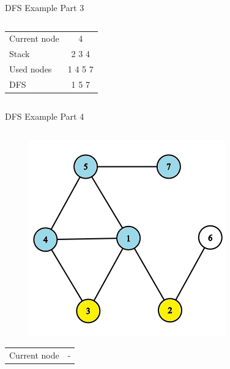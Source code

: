 \documentclass[aspectratio=169]{beamer}%
\begin{document}
\begin{frame}{DFS Example Part 3}
\begin{columns}
\begin{column}{0.32\textwidth}
\begin{figure}[!ht]
            \end{figure}
            \begin{table}[ht]
                \centering
                \begin{tabular}{l c}
                    Current node & 4\\
                    Stack & 2 3 4\\ 
                    Used nodes & 1 4 5 7\\
                    DFS & 1 5 7
                \end{tabular}
            \end{table}
        \end{column}
    \end{columns}
\end{frame}

\begin{frame}{DFS Example Part 4}
    \begin{columns}
        \begin{column}{0.32\textwidth}
            \begin{figure}[!ht]
                \centering
                \includegraphics[width=0.9\linewidth]{dfs 10.png}
            \end{figure}
            \begin{table}[ht]
                \centering
                \begin{tabular}{l c}
                    Current node & -\\

\end{tabular}
\end{table}
\end{column}
\end{columns}
\end{frame}
\end{document}
